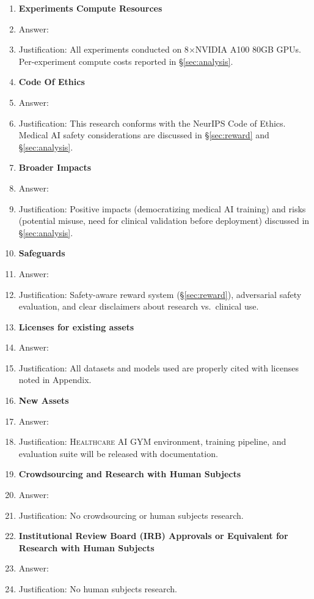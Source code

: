 \documentclass{article}
\newcommand{\gym}{\textsc{Healthcare AI GYM}}
\begin{document}
\begin{enumerate}
\item {\bf Experiments Compute Resources}
    \item[] Answer: \answerYes{}
    \item[] Justification: All experiments conducted on 8$\times$NVIDIA A100 80GB GPUs. Per-experiment compute costs reported in \S\ref{sec:analysis}.

\item {\bf Code Of Ethics}
    \item[] Answer: \answerYes{}
    \item[] Justification: This research conforms with the NeurIPS Code of Ethics. Medical AI safety considerations are discussed in \S\ref{sec:reward} and \S\ref{sec:analysis}.

\item {\bf Broader Impacts}
    \item[] Answer: \answerYes{}
    \item[] Justification: Positive impacts (democratizing medical AI training) and risks (potential misuse, need for clinical validation before deployment) discussed in \S\ref{sec:analysis}.

\item {\bf Safeguards}
    \item[] Answer: \answerYes{}
    \item[] Justification: Safety-aware reward system (\S\ref{sec:reward}), adversarial safety evaluation, and clear disclaimers about research vs.\ clinical use.

\item {\bf Licenses for existing assets}
    \item[] Answer: \answerYes{}
    \item[] Justification: All datasets and models used are properly cited with licenses noted in Appendix.

\item {\bf New Assets}
    \item[] Answer: \answerYes{}
    \item[] Justification: \gym{} environment, training pipeline, and evaluation suite will be released with documentation.

\item {\bf Crowdsourcing and Research with Human Subjects}
    \item[] Answer: \answerNA{}
    \item[] Justification: No crowdsourcing or human subjects research.

\item {\bf Institutional Review Board (IRB) Approvals or Equivalent for Research with Human Subjects}
    \item[] Answer: \answerNA{}
    \item[] Justification: No human subjects research.

\end{enumerate}
\end{document}
